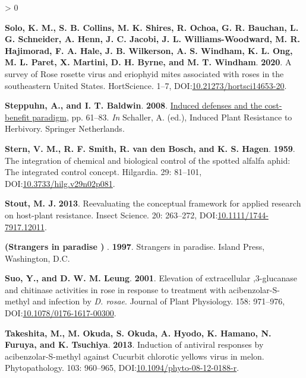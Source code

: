 \documentclass{ufdissertation}[overrideChapters] %
\newlength{\cslhangindent}
\newenvironment{CSLReferences}[2] %
 {%
  \setlength{\parindent}{0pt}
  \ifodd #1 \everypar{\setlength{\hangindent}{\cslhangindent}}\ignorespaces\fi
  \ifnum #2 > 0
  \setlength{\parskip}{#2\baselineskip}
  \fi
 }%
 {}
\begin{document}
{\begin{CSLReferences}{1}{1}
\leavevmode{}%
\textbf{Solo, K. M., S. B. Collins, M. K. Shires, R. Ochoa, G. R. Bauchan, L. G. Schneider, A. Henn, J. C. Jacobi, J. L. Williams-Woodward, M. R. Hajimorad, F. A. Hale, J. B. Wilkerson, A. S. Windham, K. L. Ong, M. L. Paret, X. Martini, D. H. Byrne, and M. T. Windham}. \textbf{2020}. A survey of {Rose rosette virus} and eriophyid mites associated with roses in the southeastern {United States}. {HortScience}. 1--7, DOI:\href{https://doi.org/10.21273/hortsci14653-20}{10.21273/hortsci14653-20}.

\leavevmode{}%
\textbf{Steppuhn, A., and I. T. Baldwin}. \textbf{2008}. \href{https://doi.org/10.1007/978-1-4020-8182-8_3}{Induced defenses and the cost-benefit paradigm}, pp. 61--83. \emph{In} Schaller, A. (ed.), Induced Plant Resistance to Herbivory. Springer Netherlands.

\leavevmode{}%
\textbf{Stern, V. M., R. F. Smith, R. van den Bosch, and K. S. Hagen}. \textbf{1959}. The integration of chemical and biological control of the spotted alfalfa aphid: The integrated control concept. Hilgardia. 29: 81--101, DOI:\href{https://doi.org/10.3733/hilg.v29n02p081}{10.3733/hilg.v29n02p081}.

\leavevmode{}%
\textbf{Stout, M. J.} \textbf{2013}. Reevaluating the conceptual framework for applied research on host-plant resistance. Insect Science. 20: 263--272, DOI:\href{https://doi.org/10.1111/1744-7917.12011}{10.1111/1744-7917.12011}.

\leavevmode{}%
\textbf{(Strangers in paradise ) }. \textbf{1997}. Strangers in paradise. Island Press, Washington, D.C.

\leavevmode{}%
\textbf{Suo, Y., and D. W. M. Leung}. \textbf{2001}. Elevation of extracellular ,3-glucanase and chitinase activities in rose in response to treatment with acibenzolar-{S}-methyl and infection by {\emph{D. rosae}}. Journal of Plant Physiology. 158: 971--976, DOI:\href{https://doi.org/10.1078/0176-1617-00300}{10.1078/0176-1617-00300}.

\leavevmode{}%
\textbf{Takeshita, M., M. Okuda, S. Okuda, A. Hyodo, K. Hamano, N. Furuya, and K. Tsuchiya}. \textbf{2013}. Induction of antiviral responses by acibenzolar-{S}-methyl against {Cucurbit chlorotic yellows virus} in melon. Phytopathology{\textregistered}. 103: 960--965, DOI:\href{https://doi.org/10.1094/phyto-08-12-0188-r}{10.1094/phyto-08-12-0188-r}.


\end{CSLReferences}}
\end{document}
